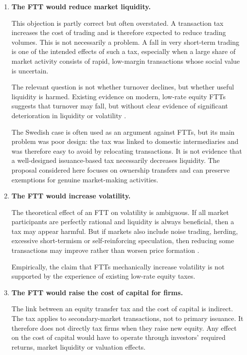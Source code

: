 \documentclass[../main]{subfiles}
\begin{document}
\begin{enumerate}

    \item \textbf{The FTT would reduce market liquidity.}

    This objection is partly correct but often overstated. A transaction tax increases the cost of trading and is therefore expected to reduce trading volumes. This is not necessarily a problem. A fall in very short-term trading is one of the intended effects of such a tax, especially when a large share of market activity consists of rapid, low-margin transactions whose social value is uncertain.

    The relevant question is not whether turnover declines, but whether useful liquidity is harmed. Existing evidence on modern, low-rate equity FTTs suggests that turnover may fall, but without clear evidence of significant deterioration in liquidity or volatility \citep{IMF2010, ColliardHoffmann2017}. 
    
    The Swedish case is often used as an argument against FTTs, but its main problem was poor design: the tax was linked to domestic intermediaries and was therefore easy to avoid by relocating transactions. It is not evidence that a well-designed issuance-based tax necessarily decreases liquidity. The proposal considered here focuses on ownership transfers and can preserve exemptions for genuine market-making activities.

    \item \textbf{The FTT would increase volatility.}

    The theoretical effect of an FTT on volatility is ambiguous. If all market participants are perfectly rational and liquidity is always beneficial, then a tax may appear harmful. But if markets also include noise trading, herding, excessive short-termism or self-reinforcing speculation, then reducing some transactions may improve rather than worsen price formation \citep{Matheson2011, McCullochPacillo2011}.

    Empirically, the claim that FTTs mechanically increase volatility is not supported by the experience of existing low-rate equity taxes. 

    \item \textbf{The FTT would raise the cost of capital for firms.}

    The link between an equity transfer tax and the cost of capital is indirect. The tax applies to secondary-market transactions, not to primary issuance. It therefore does not directly tax firms when they raise new equity. Any effect on the cost of capital would have to operate through investors' required returns, market liquidity or valuation effects.


\end{enumerate}
\end{document}
